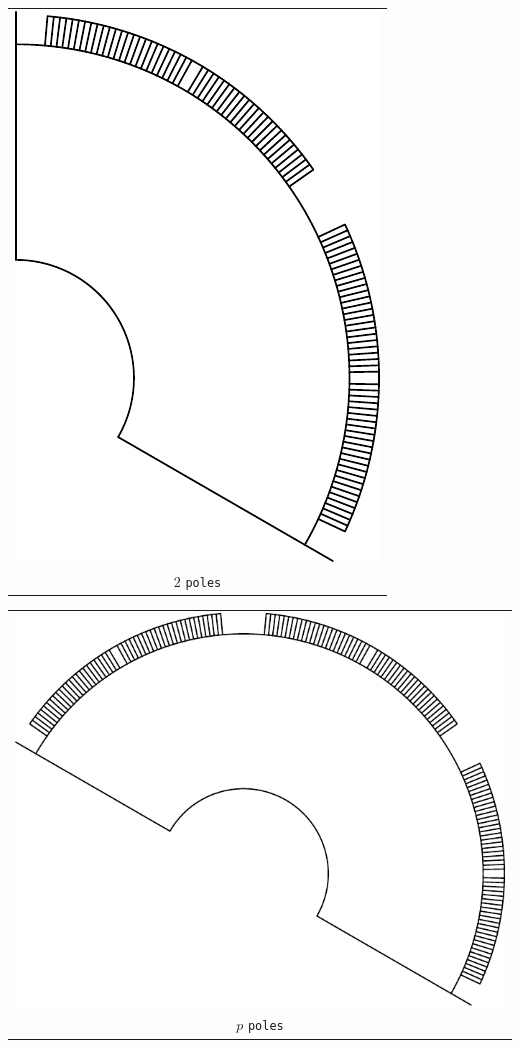 \documentclass[a4paper,11pt,oneside]{report}
\begin{document}
\begin{tabular}{c}
\includegraphics[scale=0.75]{../SPM/examples/rotors/2pole} 
\\
$ 2 $ \texttt{poles}
\end{tabular}
\vspace{5mm}

\begin{tabular}{c}
\includegraphics[scale=0.75]{../SPM/examples/rotors/ppole} 
\\
$ p $ \texttt{poles}
\end{tabular}
\vspace{5mm}
\end{document}
